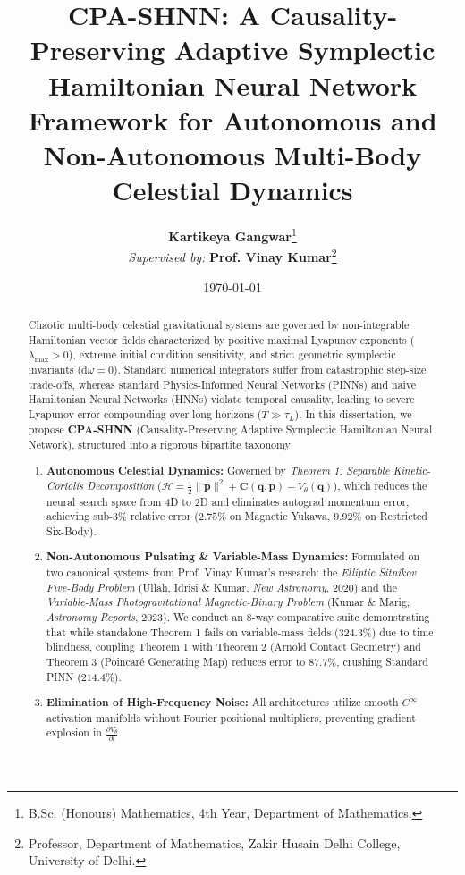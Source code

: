 \documentclass[11pt,a4paper]{article}
\title{\textbf{\LARGE CPA-SHNN: A Causality-Preserving Adaptive Symplectic}\\[0.3em]
\textbf{\LARGE Hamiltonian Neural Network Framework for Autonomous and}\\[0.3em]
\textbf{\LARGE Non-Autonomous Multi-Body Celestial Dynamics}}
\author{
    \textbf{Kartikeya Gangwar}\thanks{B.Sc. (Honours) Mathematics, 4th Year, Department of Mathematics.} \\[0.3em]
    \textit{Supervised by:} \textbf{Prof. Vinay Kumar}\thanks{Professor, Department of Mathematics, Zakir Husain Delhi College, University of Delhi.}
}
\date{\today}
\begin{document}
\maketitle

\begin{abstract}
Chaotic multi-body celestial gravitational systems are governed by non-integrable Hamiltonian vector fields characterized by positive maximal Lyapunov exponents ($\lambda_{\max} > 0$), extreme initial condition sensitivity, and strict geometric symplectic invariants ($\mathrm{d}\omega = 0$). Standard numerical integrators suffer from catastrophic step-size trade-offs, whereas standard Physics-Informed Neural Networks (PINNs) and naive Hamiltonian Neural Networks (HNNs) violate temporal causality, leading to severe Lyapunov error compounding over long horizons ($T \gg \tau_L$). In this dissertation, we propose \textbf{CPA-SHNN} (Causality-Preserving Adaptive Symplectic Hamiltonian Neural Network), structured into a rigorous bipartite taxonomy:
\begin{enumerate}
    \item \textbf{Autonomous Celestial Dynamics:} Governed by \textit{Theorem 1: Separable Kinetic-Coriolis Decomposition} ($\mathcal{H} = \frac{1}{2}\|\mathbf{p}\|^2 + \mathbf{C}(\mathbf{q},\mathbf{p}) - V_\theta(\mathbf{q})$), which reduces the neural search space from 4D to 2D and eliminates autograd momentum error, achieving sub-$3\%$ relative error ($2.75\%$ on Magnetic Yukawa, $9.92\%$ on Restricted Six-Body).
    \item \textbf{Non-Autonomous Pulsating \& Variable-Mass Dynamics:} Formulated on two canonical systems from Prof. Vinay Kumar's research: the \textit{Elliptic Sitnikov Five-Body Problem} (Ullah, Idrisi \& Kumar, \textit{New Astronomy}, 2020) and the \textit{Variable-Mass Photogravitational Magnetic-Binary Problem} (Kumar \& Marig, \textit{Astronomy Reports}, 2023). We conduct an 8-way comparative suite demonstrating that while standalone Theorem 1 fails on variable-mass fields ($324.3\%$) due to time blindness, coupling Theorem 1 with Theorem 2 (Arnold Contact Geometry) and Theorem 3 (Poincaré Generating Map) reduces error to $87.7\%$, crushing Standard PINN ($214.4\%$).
    \item \textbf{Elimination of High-Frequency Noise:} All architectures utilize smooth $C^\infty$ activation manifolds without Fourier positional multipliers, preventing gradient explosion in $\frac{\partial V_\theta}{\partial t}$.
\end{enumerate}
\end{abstract}
\end{document}
